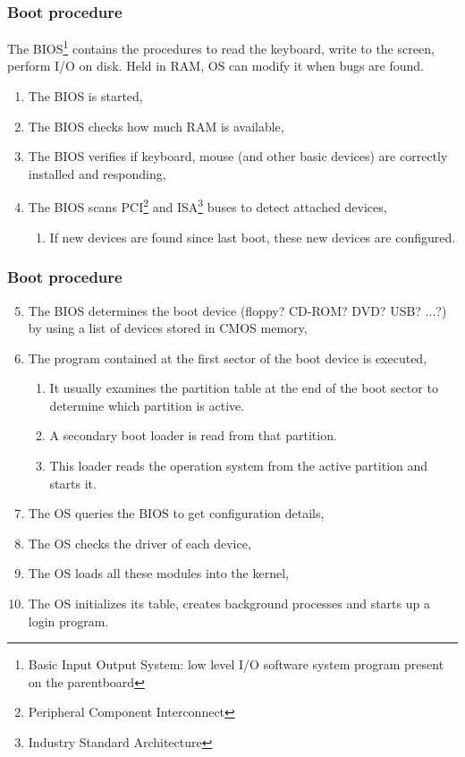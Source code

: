   \begin{frame}
    \frametitle{Boot procedure}
    The BIOS\footnote{Basic Input Output System: low level I/O software system program present on the parentboard} contains the procedures to read the keyboard, write to the screen, perform I/O on disk. Held in RAM, OS can modify it when bugs are found.
    \begin{enumerate}
      \item The BIOS is started,
      \item The BIOS checks how much RAM is available,
      \item The BIOS verifies if keyboard, mouse (and other basic devices) are correctly installed and responding,
      \item The BIOS scans PCI\footnote{Peripheral Component Interconnect} and ISA\footnote{Industry Standard Architecture} buses to detect attached devices,
        \begin{enumerate}
          \item If new devices are found since last boot, these new devices are configured.
        \end{enumerate}
    \end{enumerate}
  \end{frame}

  \begin{frame}
    \frametitle{Boot procedure}
    \begin{enumerate}
    \setcounter{enumi}{4}
      \item The BIOS determines the boot device (floppy? CD-ROM? DVD? USB? ...?) by using a list of devices stored in CMOS memory,
      \item The program contained at the first sector of the boot device is executed,
        \begin{enumerate}
          \item It usually examines the partition table at the end of the boot sector to determine which partition is active.
          \item A secondary boot loader is read from that partition.
          \item This loader reads the operation system from the active partition and starts it.
        \end{enumerate}
      \item The OS queries the BIOS to get configuration details,
      \item The OS checks the driver of each device,
      \item The OS loads all these modules into the kernel,
      \item The OS initializes its table, creates background processes and starts up a login program.
    \end{enumerate}
  \end{frame}
